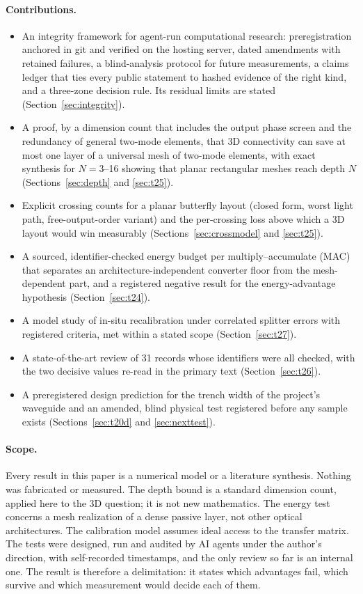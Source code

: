 \documentclass[11pt,a4paper]{article}
\begin{document}
\paragraph{Contributions.}
\begin{itemize}
\item An integrity framework for agent-run computational research: preregistration anchored in git and verified on the hosting server, dated amendments with retained failures, a blind-analysis protocol for future measurements, a claims ledger that ties every public statement to hashed evidence of the right kind, and a three-zone decision rule. Its residual limits are stated (Section~\ref{sec:integrity}).
\item A proof, by a dimension count that includes the output phase screen and the redundancy of general two-mode elements, that 3D connectivity can save at most one layer of a universal mesh of two-mode elements, with exact synthesis for $N=3$--16 showing that planar rectangular meshes reach depth $N$ (Sections~\ref{sec:depth} and \ref{sec:t25}).
\item Explicit crossing counts for a planar butterfly layout (closed form, worst light path, free-output-order variant) and the per-crossing loss above which a 3D layout would win measurably (Sections~\ref{sec:crossmodel} and \ref{sec:t25}).
\item A sourced, identifier-checked energy budget per multiply--accumulate (MAC) that separates an architecture-independent converter floor from the mesh-dependent part, and a registered negative result for the energy-advantage hypothesis (Section~\ref{sec:t24}).
\item A model study of in-situ recalibration under correlated splitter errors with registered criteria, met within a stated scope (Section~\ref{sec:t27}).
\item A state-of-the-art review of 31 records whose identifiers were all checked, with the two decisive values re-read in the primary text (Section~\ref{sec:t26}).
\item A preregistered design prediction for the trench width of the project's waveguide and an amended, blind physical test registered before any sample exists (Sections~\ref{sec:t20d} and \ref{sec:nexttest}).
\end{itemize}

\paragraph{Scope.} Every result in this paper is a numerical model or a literature synthesis. Nothing was fabricated or measured. The depth bound is a standard dimension count, applied here to the 3D question; it is not new mathematics. The energy test concerns a mesh realization of a dense passive layer, not other optical architectures. The calibration model assumes ideal access to the transfer matrix. The tests were designed, run and audited by AI agents under the author's direction, with self-recorded timestamps, and the only review so far is an internal one. The result is therefore a delimitation: it states which advantages fail, which survive and which measurement would decide each of them.
\end{document}
